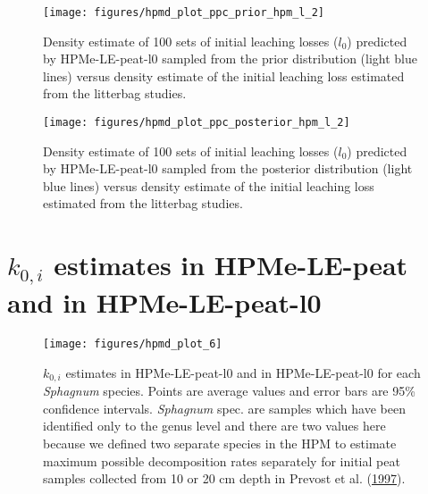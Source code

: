 \documentclass[
  12pt,
]{article}
\begin{document}
\begin{figure}[H]

{\centering \texttt{[image: figures/hpmd\_plot\_ppc\_prior\_hpm\_l\_2]} 

}

\caption{Density estimate of 100 sets of initial leaching losses (\(l_0\)) predicted by HPMe-LE-peat-l0 sampled from the prior distribution (light blue lines) versus density estimate of the initial leaching loss estimated from the litterbag studies.}\label{fig:sup-hpmd-plot-ppc-prior-hpm-l-2}
\end{figure}



\begin{figure}[H]

{\centering \texttt{[image: figures/hpmd\_plot\_ppc\_posterior\_hpm\_l\_2]} 

}

\caption{Density estimate of 100 sets of initial leaching losses (\(l_0\)) predicted by HPMe-LE-peat-l0 sampled from the posterior distribution (light blue lines) versus density estimate of the initial leaching loss estimated from the litterbag studies.}\label{fig:sup-hpmd-plot-ppc-posterior-hpm-l-2}
\end{figure}

\hypertarget{sup-4}{%
\section{\texorpdfstring{\(k_{0,i}\) estimates in HPMe-LE-peat and in HPMe-LE-peat-l0}{k\_\{0,i\} estimates in HPMe-LE-peat and in HPMe-LE-peat-l0}}\label{sup-4}}



\begin{figure}[H]

{\centering \texttt{[image: figures/hpmd\_plot\_6]} 

}

\caption{\(k_{0,i}\) estimates in HPMe-LE-peat-l0 and in HPMe-LE-peat-l0 for each \emph{Sphagnum} species. Points are average values and error bars are 95\% confidence intervals. \emph{Sphagnum} spec. are samples which have been identified only to the genus level and there are two values here because we defined two separate species in the HPM to estimate maximum possible decomposition rates separately for initial peat samples collected from 10 or 20 cm depth in Prevost et al. (\protect\hyperlink{ref-Prevost.1997}{1997}).}\label{fig:sup-hpmd-plot-6}
\end{figure}
\end{document}
